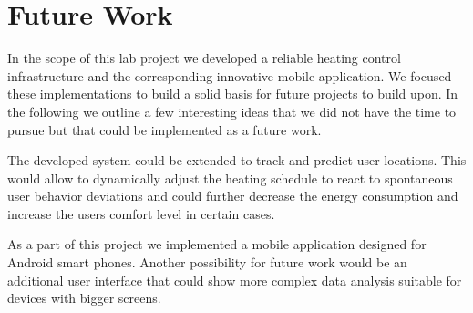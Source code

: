 
\chapter{Future Work}
\label{sec:futurework}


In the scope of this lab project we developed a reliable heating control infrastructure and the corresponding innovative mobile application.
We focused these implementations to build a solid basis for future projects to build upon.
In the following we outline a few interesting ideas that we did not have the time to pursue but that could be implemented as a future work.

The developed system could be extended to track and predict user locations.
This would allow to dynamically adjust the heating schedule to react to spontaneous user behavior deviations and could further decrease the energy consumption and increase the users comfort level in certain cases.

As a part of this project we implemented a mobile application designed for Android smart phones.
Another possibility for future work would be an additional user interface that could show more complex data analysis suitable for devices with bigger screens.

